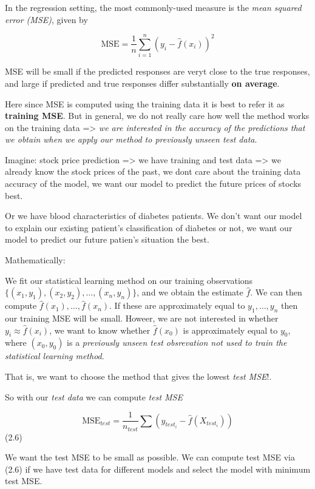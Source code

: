 \documentclass[
  letterpaper,
  DIV=11,
  numbers=noendperiod]{scrreprt}
\begin{document}
In the regression setting, the most commonly-used measure is the
\emph{mean squared error (MSE)}, given by

\[
\text{MSE} = \frac{1}{n}\sum_{i=1}^n(y_i - \hat{f}(x_i))^2
\]

MSE will be small if the predicted responses are veryt close to the true
responses, and large if predicted and true responses differ
substantially \textbf{on average}.

Here since MSE is computed using the training data it is best to refer
it as \textbf{training MSE}. But in general, we do not really care how
well the method works on the training data =\textgreater{} \emph{we are
interested in the accuracy of the predictions that we obtain when we
apply our method to previously unseen test data}.

Imagine: stock price prediction =\textgreater{} we have training and
test data =\textgreater{} we already know the stock prices of the past,
we dont care about the training data accuracy of the model, we want our
model to predict the future prices of stocks best.

Or we have blood characteristics of diabetes patients. We don't want our
model to explain our existing patient's classification of diabetes or
not, we want our model to predict our future patien's situation the
best.

Mathematically:

We fit our statistical learning method on our training observations
\(\{(x_1,y_1), (x_2,y_2), \dots, (x_n,y_n)\}\), and we obtain the
estimate \(\hat{f}\). We can then compute
\(\hat{f}(x_1),\dots, \hat{f}(x_n)\). If these are approximately equal
to \(y_1, \dots, y_n\) then our training MSE will be small. Howeer, we
are not interested in whether \(y_i \approx \hat{f}(x_i)\), we want to
know whether \(\hat{f}(x_0)\) is approximately equal to \(y_0\), where
\((x_0,y_0)\) is a \emph{previously unseen test obsrevation not used to
train the statistical learning method}.

That is, we want to choose the method that gives the lowest \emph{test
MSE}!.

So with our \emph{test data} we can compute \emph{test MSE}

\[
\text{MSE}_{test} =\frac{1}{n_{test}} \sum(y_{test_{i}} - \hat{f}(X_{test_i}))
\] (2.6)

We want the test MSE to be small as possible. We can compute test MSE
via (2.6) if we have test data for different models and select the model
with minimum test MSE.
\end{document}
